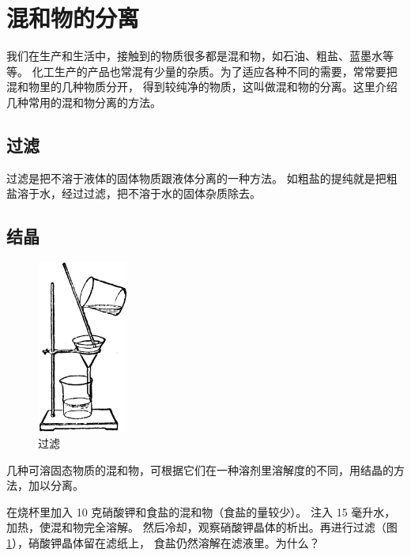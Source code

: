 \section{混和物的分离}\label{sec:4-5}

我们在生产和生活中，接触到的物质很多都是混和物，如石油、粗盐、蓝墨水等等。
化工生产的产品也常混有少量的杂质。为了适应各种不同的需要，常常要把混和物里的几种物质分开，
得到较纯净的物质，这叫做混和物的分离。这里介绍几种常用的混和物分离的方法。

\subsection{过滤}

过滤是把不溶于液体的固体物质跟液体分离的一种方法。
如粗盐的提纯就是把粗盐溶于水，经过过滤，把不溶于水的固体杂质除去。


\subsection{结晶}

\begin{figure}
    \centering
    \includegraphics[width=3cm]{../pic/czhx1-ch4-9}
    \caption{过滤}\label{fig:4-9}
\end{figure}

几种可溶固态物质的混和物，可根据它们在一种溶剂里溶解度的不同，用结晶的方法，加以分离。

\begin{shiyan}
    在烧杯里加入 10 克硝酸钾和食盐的混和物（食盐的量较少）。
    注入 15 毫升水，加热，使混和物完全溶解。
    然后冷却，观察硝酸钾晶体的析出。再进行过滤（图 \ref{fig:4-9}），硝酸钾晶体留在滤纸上，
    食盐仍然溶解在滤液里。为什么？
\end{shiyan}

